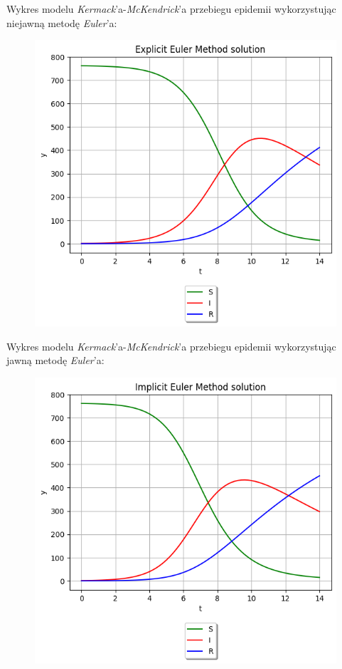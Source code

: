 \documentclass{article}
\begin{document}
Wykres modelu \textit{Kermack}’a-\textit{McKendrick}'a przebiegu epidemii
wykorzystując niejawną metodę \textit{Euler}'a:
\begin{figure}[H]
  \includegraphics[width=\linewidth]{figures/SIR_expl.png}
\end{figure}

Wykres modelu \textit{Kermack}’a-\textit{McKendrick}'a przebiegu epidemii
wykorzystując jawną metodę \textit{Euler}'a:
\begin{figure}[H]
  \includegraphics[width=\linewidth]{figures/SIR_impl.png}
\end{figure}
\end{document}
